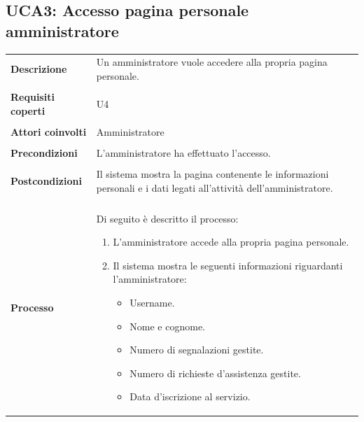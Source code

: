 \documentclass[10pt,a4paper]{report}
\begin{document}
	\subsection{UCA3: Accesso pagina personale amministratore}
	\begin{tabular}{lp{}}
		\textbf{Descrizione}&Un amministratore vuole accedere alla propria pagina personale.\\
		\\
		\textbf{Requisiti coperti}&U4\\
		\\
		\textbf{Attori coinvolti}&Amministratore\\
		\\
		\textbf{Precondizioni}&L'amministratore ha effettuato l'accesso.\\
		\\
		\textbf{Postcondizioni}&Il sistema mostra la pagina contenente le informazioni personali e i dati legati all'attività dell'amministratore.\\
		\\
		\textbf{Processo}&Di seguito è descritto il processo:
		\begin{enumerate}
			\item L'amministratore accede alla propria pagina personale.
			\item Il sistema mostra le seguenti informazioni riguardanti l'amministratore:
			\begin{itemize}
				\item Username.
				\item Nome e cognome.
				\item Numero di segnalazioni gestite.
				\item Numero di richieste d'assistenza gestite.
				\item Data d'iscrizione al servizio.
			\end{itemize}
		\end{enumerate}
	\end{tabular}
	
	
\end{document}

